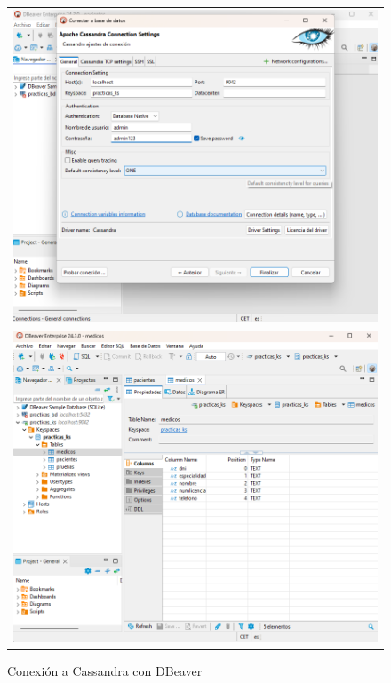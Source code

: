 \documentclass{article}
\begin{document}
\begin{figure}[H]
    \centering
    \begin{tabular}{c}  %
        \includegraphics[width=1\textwidth]{cassandra1.png}\\[10pt]
        \includegraphics[width=1\textwidth]{cassandra2.png} 
    \end{tabular}
    \caption{Conexión a Cassandra con DBeaver}
    \label{fig:Configuracion_DBeaver_Cassandra}
\end{figure}
\end{document}
